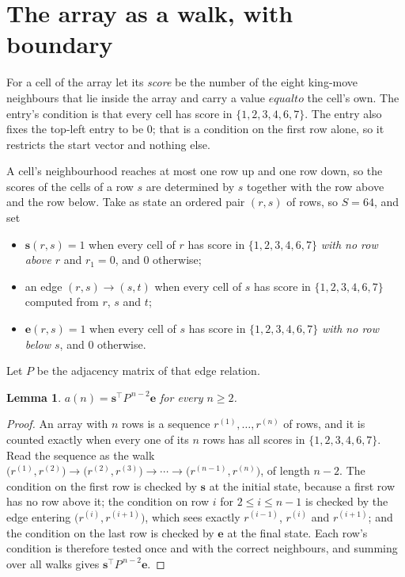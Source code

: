 \documentclass[11pt,a4paper]{article}
\theoremstyle{plain}
\newtheorem{lemma}[theorem]{Lemma}
\theoremstyle{definition}
\begin{document}
\section{The array as a walk, with boundary}

For a cell of the array let its \emph{score} be the number of the eight king-move neighbours that lie inside
the array and carry a value $equal to$ the cell's own. The entry's condition is that every cell
has score in $\{1,2,3,4,6,7\}$. The entry also fixes the top-left entry to be $0$; that is a condition on the first row alone, so it restricts the start vector and nothing else.

A cell's neighbourhood reaches at most one row up and one row down, so the scores of the
cells of a row $s$ are determined by $s$ together with the row above and the row below.
Take as state an ordered pair $(r,s)$ of rows, so $S=64$, and set
\begin{itemize}
\item $\mathbf{s}(r,s)=1$ when every cell of $r$ has score in $\{1,2,3,4,6,7\}$ \emph{with no row
above $r$} and $r_1=0$, and $0$ otherwise;
\item an edge $(r,s)\to(s,t)$ when every cell of $s$ has score in $\{1,2,3,4,6,7\}$ computed from
$r$, $s$ and $t$;
\item $\mathbf{e}(r,s)=1$ when every cell of $s$ has score in $\{1,2,3,4,6,7\}$ \emph{with no row
below $s$}, and $0$ otherwise.
\end{itemize}
Let $P$ be the adjacency matrix of that edge relation.

\begin{lemma}\label{lem:walk}
$a(n)=\mathbf{s}^{\!\top}P^{\,n-2}\mathbf{e}$ for every $n\ge2$.
\end{lemma}

\begin{proof}
An array with $n$ rows is a sequence $r^{(1)},\dots,r^{(n)}$ of rows, and it is counted
exactly when every one of its $n$ rows has all scores in $\{1,2,3,4,6,7\}$. Read the sequence as the
walk $\bigl(r^{(1)},r^{(2)}\bigr)\to\bigl(r^{(2)},r^{(3)}\bigr)\to\cdots\to
\bigl(r^{(n-1)},r^{(n)}\bigr)$, of length $n-2$. The condition on the first row is
checked by $\mathbf{s}$ at the initial state, because a first row has no row above it; the
condition on row $i$ for $2\le i\le n-1$ is checked by the edge entering
$\bigl(r^{(i)},r^{(i+1)}\bigr)$, which sees exactly $r^{(i-1)}$, $r^{(i)}$ and
$r^{(i+1)}$; and the condition on the last row is checked by $\mathbf{e}$ at the final
state. Each row's condition is therefore tested once and with the correct neighbours, and
summing over all walks gives $\mathbf{s}^{\!\top}P^{\,n-2}\mathbf{e}$.
\end{proof}
\end{document}
